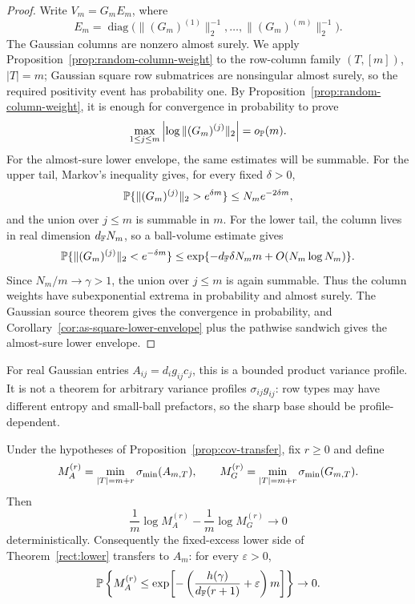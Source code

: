 \begin{proof}
Write \(V_m=G_mE_m\), where
\[
  E_m=\operatorname{diag}\bigl(\|(G_m)^{(1)}\|_2^{-1},\ldots,
  \|(G_m)^{(m)}\|_2^{-1}\bigr).
\]
The Gaussian columns are nonzero almost surely.  We apply
Proposition~\ref{prop:random-column-weight} to the row-column family
\((T,[m])\), \(|T|=m\); Gaussian square row submatrices are nonsingular almost
surely, so the required positivity event has probability one.
By Proposition~\ref{prop:random-column-weight}, it is enough for convergence in
probability to prove
\[
  \max_{1\le j\le m}\left|\log\|(G_m)^{(j)}\|_2\right|=o_{\mathbb{P}}(m).
\]
For the almost-sure lower envelope, the same estimates will be summable.  For
the upper tail, Markov's inequality gives, for every fixed \(\delta>0\),
\[
  \mathbb{P}\{\|(G_m)^{(j)}\|_2>e^{\delta m}\}
  \le N_m e^{-2\delta m},
\]
and the union over \(j\le m\) is summable in \(m\).  For the lower tail, the
column lives in real dimension \(d_{\mathbb{F}} N_m\), so a ball-volume estimate gives
\[
  \mathbb{P}\{\|(G_m)^{(j)}\|_2<e^{-\delta m}\}
  \le \exp\{-d_{\mathbb{F}}\delta N_m m+O(N_m\log N_m)\}.
\]
Since \(N_m/m\to\gamma>1\), the union over \(j\le m\) is again summable.  Thus
the column weights have subexponential extrema in probability and almost
surely.  The Gaussian source theorem gives the convergence in probability, and
Corollary~\ref{cor:as-square-lower-envelope} plus the pathwise sandwich gives
the almost-sure lower envelope.
\end{proof}

\begin{remark}
For real Gaussian entries \(A_{ij}=d_i g_{ij}c_j\), this is a bounded product
variance profile.  It is not a theorem for arbitrary variance profiles
\(\sigma_{ij}g_{ij}\): row types may have different entropy and small-ball
prefactors, so the sharp base should be profile-dependent.
\end{remark}

\begin{corollary}\label{cor:fixed-excess-transfer}
Under the hypotheses of Proposition~\ref{prop:cov-transfer}, fix \(r\ge0\) and
define
\[
  M_A^{(r)}=\min_{|T|=m+r}\sigma_{\min}(A_{m,T}),
  \qquad
  M_G^{(r)}=\min_{|T|=m+r}\sigma_{\min}(G_{m,T}).
\]
Then
\[
  \frac1m\log M_A^{(r)}-\frac1m\log M_G^{(r)}\to0
\]
deterministically.  Consequently the fixed-excess lower side of
Theorem~\ref{rect:lower} transfers to \(A_m\): for every \(\varepsilon>0\),
\[
  \mathbb{P}\left\{M_A^{(r)}\le
     \exp\!\left[-\left(\frac{h(\gamma)}{d_{\mathbb{F}}(r+1)}+\varepsilon\right)m\right]\right\}
  \to0.
\]
\end{corollary}

